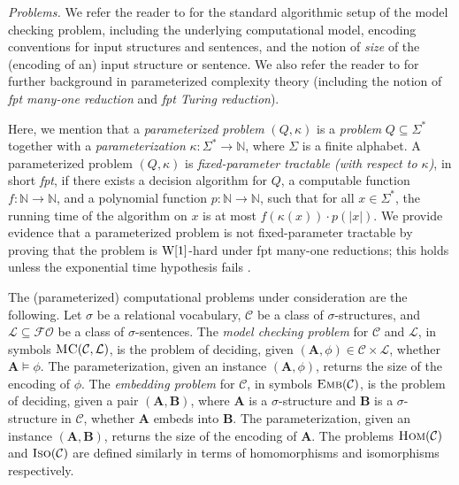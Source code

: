 \documentclass[usletter]{article}
\newcommand{\fo}{\mathcal{FO}}
\begin{document}
\medskip

\noindent \textit{Problems.}  We refer the reader to \cite{FlumGrohe06} for 
the standard algorithmic setup of the model checking problem, 
including the underlying computational model, 
encoding conventions for input structures and sentences, 
and the notion of \emph{size} of the (encoding of an) input structure or sentence.  
We also refer the reader to \cite{FlumGrohe06} for further background in parameterized complexity theory 
(including the notion of \emph{fpt many-one reduction} and \emph{fpt Turing reduction}).

Here, we mention that a \emph{parameterized problem} $(Q,\kappa)$ is a 
\emph{problem} $Q \subseteq \Sigma^*$ together 
with a \emph{parameterization} $\kappa \colon \Sigma^* \to \mathbb{N}$, where $\Sigma$ is a finite alphabet.  
A parameterized problem $(Q,\kappa)$ is \emph{fixed-parameter tractable (with respect to $\kappa$)}, 
in short \emph{fpt}, if there exists a decision algorithm for $Q$, a computable function $f \colon \mathbb{N} \to \mathbb{N}$, 
and a polynomial function $p \colon \mathbb{N} \to \mathbb{N}$, 
such that for all $x \in \Sigma^*$, the running time of the algorithm on $x$ 
is at most $f(\kappa(x)) \cdot p(|x|)$.  
We provide evidence that 
a parameterized problem is not fixed-parameter tractable 
by proving that the problem is $\textup{W}[1]$-hard under fpt many-one reductions; 
this holds unless the exponential time hypothesis fails \cite{FlumGrohe06}.

The (parameterized) computational problems under consideration are the following.  
Let $\sigma$ be a relational vocabulary, 
$\mathcal{C}$ be a class of 
$\sigma$-structures, 
and $\mathcal{L} \subseteq \fo$ be a class of $\sigma$-sentences.  
The \emph{model checking problem} for $\mathcal{C}$ and $\mathcal{L}$, 
in symbols $\textsc{MC}(\mathcal{C},\mathcal{L})$, is the problem of deciding, 
given $(\mathbf{A},\phi) \in \mathcal{C} \times \mathcal{L}$, 
whether $\mathbf{A} \models \phi$.  The parameterization, given an instance $(\mathbf{A},\phi)$, 
returns the size of the encoding of $\phi$.  The \emph{embedding problem} 
for $\mathcal{C}$, 
in symbols $\textsc{Emb}(\mathcal{C})$, 
is the problem of deciding, given a pair $(\mathbf{A},\mathbf{B})$, 
where $\mathbf{A}$ is a $\sigma$-structure and 
$\mathbf{B}$ is a $\sigma$-structure in $\mathcal{C}$, 
whether $\mathbf{A}$ embeds into $\mathbf{B}$. 
The parameterization, given an instance $(\mathbf{A},\mathbf{B})$, 
returns the size of the encoding of $\mathbf{A}$.  The problems $\textsc{Hom}(\mathcal{C})$ 
and $\textsc{Iso}(\mathcal{C})$ are defined similarly 
in terms of homomorphisms and isomorphisms respectively.  
\end{document}

